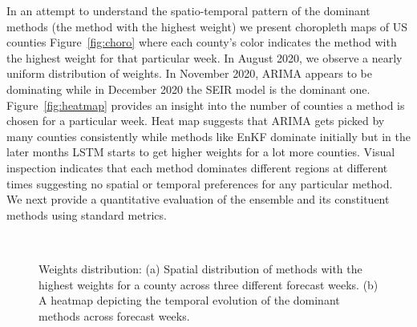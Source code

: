 \documentclass[sigconf]{acmart}
\begin{document}
 In an attempt to understand the spatio-temporal pattern of the dominant methods (the method with the highest weight) we present choropleth maps of US counties Figure~\ref{fig:choro} where each county's color indicates the method with the highest weight for that particular week. In August 2020, we observe a nearly uniform distribution of weights. In November 2020, ARIMA appears to be dominating while in December 2020 the SEIR model is the dominant one. Figure~\ref{fig:heatmap} provides an insight into the number of counties a method is chosen for a particular week. Heat map suggests that ARIMA gets picked by many counties consistently while methods like EnKF dominate initially but in the later months LSTM starts to get higher weights for a lot more counties. Visual inspection indicates that each method dominates different regions at different times suggesting no spatial or temporal preferences for any particular method. We next provide a quantitative evaluation of the ensemble and its constituent methods using standard metrics. 
\begin{figure}
    \centering
    \\
    \caption{Weights distribution: (a) Spatial distribution of methods with the highest weights for a county across three different forecast weeks. (b) A heatmap depicting the temporal evolution of the dominant methods across forecast weeks.}
    \label{fig:weight_dist}
\end{figure}
\end{document}
